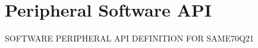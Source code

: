 \hypertarget{group__SAME70Q21__api}{}\section{Peripheral Software A\+PI}
\label{group__SAME70Q21__api}
S\+O\+F\+T\+W\+A\+RE P\+E\+R\+I\+P\+H\+E\+R\+AL A\+PI D\+E\+F\+I\+N\+I\+T\+I\+ON F\+OR S\+A\+M\+E70\+Q21 